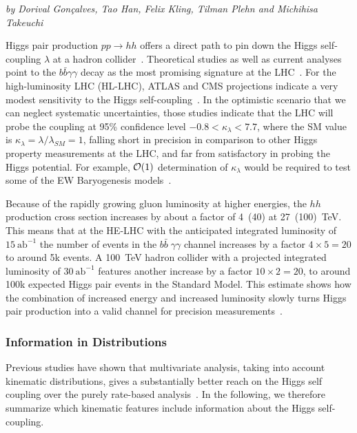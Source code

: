 \begin{center}
\textit{by Dorival Gon\c{c}alves, Tao Han, Felix Kling, Tilman Plehn and Michihisa Takeuchi}
\end{center}

Higgs pair production $pp\rightarrow hh$ offers a direct path to pin
down the Higgs self-coupling $\lambda$ at a hadron collider~\cite{hh-orig,hh-early}.  
Theoretical studies as well as current analyses
point to the $b\bar{b}\gamma\gamma$ decay as the most promising
signature at the LHC~\cite{current-gamma}. 
For the high-luminosity LHC (HL-LHC),
ATLAS and CMS projections indicate a very modest sensitivity to the
Higgs self-coupling~\cite{hl-lhc}. 
In the optimistic scenario that we can neglect systematic
uncertainties, those studies indicate that the LHC will probe the
coupling at 95\% confidence level $-0.8 < \kappa_\lambda < 7.7$, where the SM value is $\kappa_\lambda = \lambda/\lambda_{SM}=1$, 
falling short in precision in comparison to other Higgs 
property measurements at the LHC, and far from satisfactory in probing the
Higgs potential. For example, ${\cal O}(1)$ determination of $\kappa_\lambda$ would be required to 
test some of the EW Baryogenesis models~\cite{ew_phase}.

Because of the rapidly growing gluon luminosity at higher energies,
the $hh$ production cross section increases by about a factor of
4~(40) at 27~(100)~TeV.  This means that at the HE-LHC with the
anticipated integrated luminosity of $15~\text{ab}^{-1}$ the number of events in
the $b\bar{b} \; \gamma \gamma$ channel increases by a factor $4
\times 5 = 20$ to around 5k events.  A 100~TeV hadron collider with
a projected integrated luminosity of $30~\text{ab}^{-1}$ features another
increase by a factor $10 \times 2=20$, to around 100k expected Higgs
pair events in the Standard Model.
This estimate shows how the combination of increased energy and
increased luminosity slowly turns Higgs pair production into a valid
channel for precision measurements~\cite{he-lhc-hh}. 

\subsubsection{Information in Distributions}
\label{sec:features}

Previous studies have shown that multivariate analysis, taking into 
account kinematic distributions, gives a substantially better reach 
on the Higgs self coupling over the purely rate-based 
analysis~\cite{he-lhc-hh,madmax-hh,vernon,martin}. In the following, we therefore 
summarize which kinematic features include information about the 
Higgs self-coupling. 

